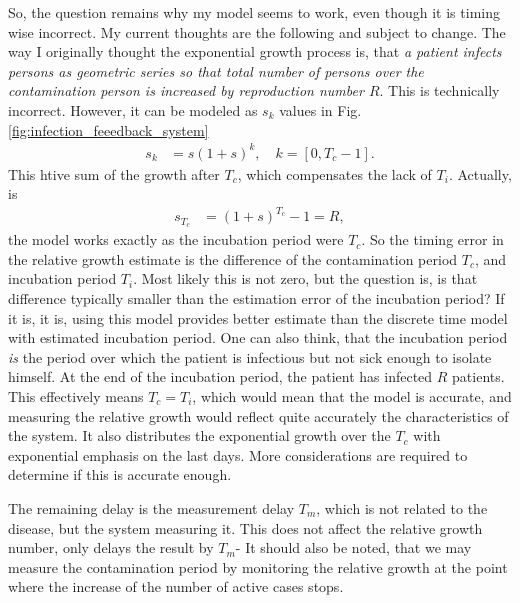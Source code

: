 So, the
question remains why my model seems to work, even though it is timing wise
incorrect. My current thoughts are the following and subject to change. The
way I originally thought the exponential growth process is, that \emph{a
    patient infects persons as geometric series so that total number of persons over the
contamination person is increased by reproduction number $R$}. This is technically incorrect.
However, it can be modeled as $s_k$  values in Fig. \ref{fig:infection_feeedback_system}
\begin{align}
    s_k&=s\left(1+s\right)^k, \quad k=\left[0,T_c-1\right].
\end{align}
This htive sum of the growth after $T_c$, which compensates the lack of $T_i$.
Actually, is  
\begin{align}
    s_{T_c}&=\left(1+s\right)^{T_c}-1=R,
\end{align}
the model works exactly as the incubation period were $T_c$. So the timing
error in the relative growth estimate is the difference of the contamination
period $T_c$, and incubation period $T_i$. Most likely this is not zero, but
the question is, is that difference typically smaller than the estimation
error of the incubation period? If it is, it is, using this model provides
better estimate than the discrete time model with estimated
incubation period. One can also think, that the incubation period \emph{is}
the period over which the patient is infectious but not sick enough to isolate
himself. At the end of the incubation period, the patient has infected $R$
patients. This effectively means $T_c=T_i$, which would mean that the model is
accurate, and measuring the relative growth would reflect quite accurately the
characteristics of the system. It also distributes the exponential growth
over the $T_c$ with exponential emphasis on the last days. More considerations
are required to determine if this is accurate enough.

The remaining delay is the measurement delay
$T_m$, which is not related to the disease, but the system measuring it. This
does not affect the relative growth number, only delays the result by $T_m$-
It should also be noted, that we may measure the contamination period by
monitoring the relative growth at the point where the increase of the number
of active cases stops. 

